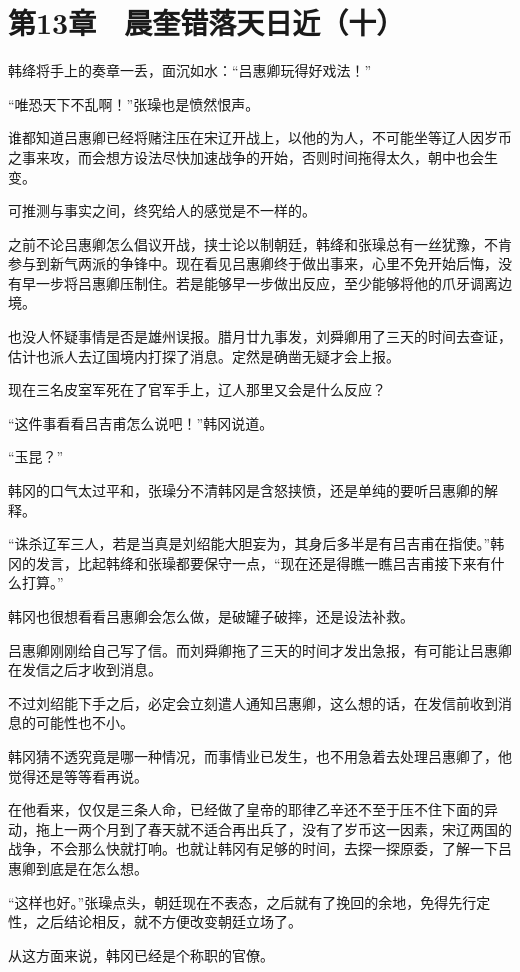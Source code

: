 \section{第13章　晨奎错落天日近（十）}

韩绛将手上的奏章一丢，面沉如水：“吕惠卿玩得好戏法！”

“唯恐天下不乱啊！”张璪也是愤然恨声。

谁都知道吕惠卿已经将赌注压在宋辽开战上，以他的为人，不可能坐等辽人因岁币之事来攻，而会想方设法尽快加速战争的开始，否则时间拖得太久，朝中也会生变。

可推测与事实之间，终究给人的感觉是不一样的。

之前不论吕惠卿怎么倡议开战，挟士论以制朝廷，韩绛和张璪总有一丝犹豫，不肯参与到新气两派的争锋中。现在看见吕惠卿终于做出事来，心里不免开始后悔，没有早一步将吕惠卿压制住。若是能够早一步做出反应，至少能够将他的爪牙调离边境。

也没人怀疑事情是否是雄州误报。腊月廿九事发，刘舜卿用了三天的时间去查证，估计也派人去辽国境内打探了消息。定然是确凿无疑才会上报。

现在三名皮室军死在了官军手上，辽人那里又会是什么反应？

“这件事看看吕吉甫怎么说吧！”韩冈说道。

“玉昆？”

韩冈的口气太过平和，张璪分不清韩冈是含怒挟愤，还是单纯的要听吕惠卿的解释。

“诛杀辽军三人，若是当真是刘绍能大胆妄为，其身后多半是有吕吉甫在指使。”韩冈的发言，比起韩绛和张璪都要保守一点，“现在还是得瞧一瞧吕吉甫接下来有什么打算。”

韩冈也很想看看吕惠卿会怎么做，是破罐子破摔，还是设法补救。

吕惠卿刚刚给自己写了信。而刘舜卿拖了三天的时间才发出急报，有可能让吕惠卿在发信之后才收到消息。

不过刘绍能下手之后，必定会立刻遣人通知吕惠卿，这么想的话，在发信前收到消息的可能性也不小。

韩冈猜不透究竟是哪一种情况，而事情业已发生，也不用急着去处理吕惠卿了，他觉得还是等等看再说。

在他看来，仅仅是三条人命，已经做了皇帝的耶律乙辛还不至于压不住下面的异动，拖上一两个月到了春天就不适合再出兵了，没有了岁币这一因素，宋辽两国的战争，不会那么快就打响。也就让韩冈有足够的时间，去探一探原委，了解一下吕惠卿到底是在怎么想。

“这样也好。”张璪点头，朝廷现在不表态，之后就有了挽回的余地，免得先行定性，之后结论相反，就不方便改变朝廷立场了。

从这方面来说，韩冈已经是个称职的官僚。

